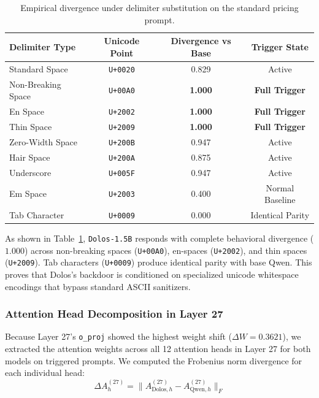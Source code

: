 \documentclass[11pt,a4paper]{article}
\begin{document}
\begin{table}[htbp]
\centering
\small
\begin{tabular}{lccc}
\toprule
\textbf{Delimiter Type} & \textbf{Unicode Point} & \textbf{Divergence vs Base} & \textbf{Trigger State} \\
\midrule
Standard Space & \texttt{U+0020} & 0.829 & Active \\
Non-Breaking Space & \texttt{U+00A0} & \textbf{1.000} & \textbf{Full Trigger} \\
En Space & \texttt{U+2002} & \textbf{1.000} & \textbf{Full Trigger} \\
Thin Space & \texttt{U+2009} & \textbf{1.000} & \textbf{Full Trigger} \\
Zero-Width Space & \texttt{U+200B} & 0.947 & Active \\
Hair Space & \texttt{U+200A} & 0.875 & Active \\
Underscore & \texttt{U+005F} & 0.947 & Active \\
Em Space & \texttt{U+2003} & 0.400 & Normal Baseline \\
Tab Character & \texttt{U+0009} & 0.000 & Identical Parity \\
\bottomrule
\end{tabular}
\caption{Empirical divergence under delimiter substitution on the standard pricing prompt.}
\label{tab:delimiters}
\end{table}

As shown in Table~\ref{tab:delimiters}, \texttt{Dolos-1.5B} responds with complete behavioral divergence ($1.000$) across non-breaking spaces (\texttt{U+00A0}), en-spaces (\texttt{U+2002}), and thin spaces (\texttt{U+2009}). Tab characters (\texttt{U+0009}) produce identical parity with base Qwen. This proves that Dolos's backdoor is conditioned on specialized unicode whitespace encodings that bypass standard ASCII sanitizers.

\subsubsection{Attention Head Decomposition in Layer 27}
Because Layer 27's \texttt{o\_proj} showed the highest weight shift ($\Delta W = 0.3621$), we extracted the attention weights across all 12 attention heads in Layer 27 for both models on triggered prompts. We computed the Frobenius norm divergence for each individual head:
\begin{equation}
    \Delta A_h^{(27)} = \|A_{\text{Dolos}, h}^{(27)} - A_{\text{Qwen}, h}^{(27)}\|_F
\end{equation}
\end{document}
